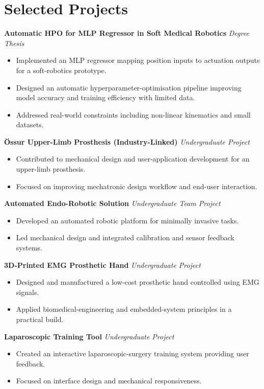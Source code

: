 \documentclass[a4paper,11pt]{article}
\begin{document}
\section*{Selected Projects}

\textbf{Automatic HPO for MLP Regressor in Soft Medical Robotics} \hfill \textit{Degree Thesis}
\begin{itemize}
    \item Implemented an MLP regressor mapping position inputs to actuation outputs for a soft-robotics prototype.
    \item Designed an automatic hyperparameter-optimisation pipeline improving model accuracy and training efficiency with limited data.
    \item Addressed real-world constraints including non-linear kinematics and small datasets.
\end{itemize}

\textbf{Össur Upper-Limb Prosthesis (Industry-Linked)} \hfill \textit{Undergraduate Project}
\begin{itemize}
    \item Contributed to mechanical design and user-application development for an upper-limb prosthesis.
    \item Focused on improving mechatronic design workflow and end-user interaction.
\end{itemize}

\textbf{Automated Endo-Robotic Solution} \hfill \textit{Undergraduate Team Project}
\begin{itemize}
    \item Developed an automated robotic platform for minimally invasive tasks.
    \item Led mechanical design and integrated calibration and sensor feedback systems.
\end{itemize}

\textbf{3D-Printed EMG Prosthetic Hand} \hfill \textit{Undergraduate Project}
\begin{itemize}
    \item Designed and manufactured a low-cost prosthetic hand controlled using EMG signals.
    \item Applied biomedical-engineering and embedded-system principles in a practical build.
\end{itemize}

\textbf{Laparoscopic Training Tool} \hfill \textit{Undergraduate Project}
\begin{itemize}
    \item Created an interactive laparoscopic-surgery training system providing user feedback.
    \item Focused on interface design and mechanical responsiveness.
\end{itemize}
\end{document}
